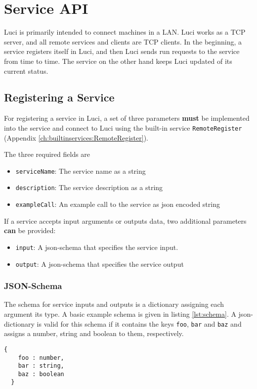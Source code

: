 \section{Service API}
\label{ch:serviceapi}

Luci is primarily intended to connect machines in a LAN. Luci works as a TCP server, and all remote services and clients are TCP clients. In the beginning, a service registers itself in Luci, and then Luci sends run requests to the service from time to time. The service on the other hand keeps Luci updated of its current status.

\subsection{Registering a Service}

For registering a service in Luci, a set of three parameters \textbf{must} be implemented into the service and connect to Luci using the built-in service \texttt{RemoteRegister} (Appendix \ref{ch:builtinservices:RemoteRegister}).

The three required fields are
\begin{itemize}
  \item \texttt{serviceName}: The service name as a string
  \item \texttt{description}: The service description as a string
  \item \texttt{exampleCall}: An example call to the service as json encoded string
\end{itemize}

If a service accepts input arguments or outputs data, two additional parameters \textbf{can} be provided:
\begin{itemize}
  \item \texttt{input}: A json-schema that specifies the service input.
  \item \texttt{output}: A json-schema that specifies the service output
\end{itemize}

\subsubsection{JSON-Schema}

The schema for service inputs and outputs is a dictionary assigning each argument its type. A basic example schema is given in listing \ref{lst:schema}. A json-dictionary is valid for this schema if it contains the keys \texttt{foo}, \texttt{bar} and \texttt{baz} and assigns a number, string and boolean to them, respectively.
\begin{lstlisting}[caption={JSON Schema}, label={lst:schema}]
  {
    foo : number,
    bar : string,
    baz : boolean
  }
\end{lstlisting}

